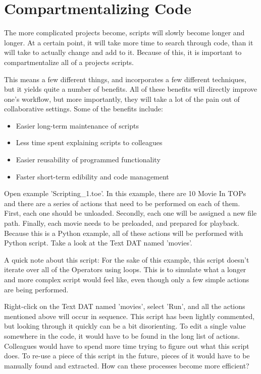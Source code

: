 
\section{Compartmentalizing Code}

\begin{fullwidth}

The more complicated projects become, scripts will slowly become longer and longer. At a certain point, it will take more time to search through code, than it will take to actually change and add to it. Because of this, it is important to compartmentalize all of a projects scripts.

This means a few different things, and incorporates a few different techniques, but it yields quite a number of benefits. All of these benefits will directly improve one's workflow, but more importantly, they will take a lot of the pain out of collaborative settings. Some of the benefits include:

\begin{itemize}
\item Easier long-term maintenance of scripts
\item Less time spent explaining scripts to colleagues
\item Easier reusability of programmed functionality
\item Faster short-term edibility and code management
\end{itemize}

Open example 'Scripting\_1.toe'. In this example, there are 10 Movie In TOPs and there are a series of actions that need to be performed on each of them. First, each one should be unloaded. Secondly, each one will be assigned a new file path. Finally, each movie needs to be preloaded, and prepared for playback. Because this is a Python example, all of these actions will be performed with Python script. Take a look at the Text DAT named 'movies'.

A quick note about this script: For the sake of this example, this script doesn't iterate over all of the Operators using loops. This is to simulate what a longer and more complex script would feel like, even though only a few simple actions are being performed.

Right-click on the Text DAT named 'movies', select 'Run', and all the actions mentioned above will occur in sequence. This script has been lightly commented, but looking through it quickly can be a bit disorienting. To edit a single value somewhere in the code, it would have to be found in the long list of actions. Colleagues would have to spend more time trying to figure out what this script does. To re-use a piece of this script in the future, pieces of it would have to be manually found and extracted. How can these processes become more efficient?


\end{fullwidth}
